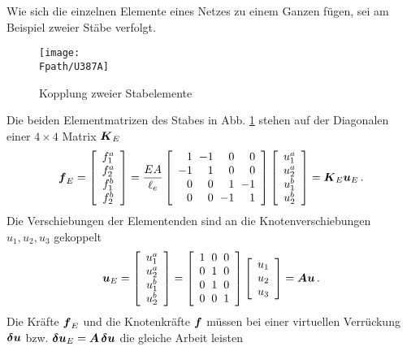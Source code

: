 Wie sich die einzelnen Elemente eines Netzes zu einem Ganzen f\"{u}gen, sei am Beispiel zweier St\"{a}be verfolgt.

\begin{figure}[tbp] \centering
\centering
\texttt{[image: \\Fpath/U387A]}
\caption{Kopplung zweier Stabelemente }
\label{U387A}
\end{figure}%

Die beiden Elementmatrizen des Stabes in Abb. \ref{U387A} stehen auf der Diagonalen einer $4 \times 4$ Matrix $\mbox{\boldmath $K$}_E$
\begin{align}
\vek f_E = \left[ \barr{c} f_1^a \\ f_2^a \\ f_1^b \\ f_2^b \earr \right] =  \frac{EA}{\ell_e} \left [
\barr {r @{\hspace{2mm}} r @{\hspace{2mm}} r @{\hspace{2mm}} r} 1 & -1 & 0 & 0 \\ -1 & 1 & 0 & 0 \\ 0 & 0 & 1 & -1 \\ 0 & 0 & -1 & 1 \\ \earr \right] \left[ \barr{cc} u_1^a \\ u_2^a \\ u_1^b \\ u_2^b \earr \right] = \vek K_E\vek u_E\,.
\end{align}
Die Verschiebungen der Elementenden sind an die Knotenverschiebungen $u_1, u_2, u_3$ gekoppelt
\begin{align}
\vek u_E = \left[ \barr{c} u_1^a \\ u_2^a \\ u_1^b \\ u_2^b \earr \right] = \left [
\barr {r @{\hspace{2mm}} r @{\hspace{2mm}} r } 1 & 0 & 0  \\ 0 & 1 & 0 \\ 0 & 1 & 0 \\ 0 & 0 &  1 \\ \earr \right] \left[ \barr{cc} u_1 \\ u_2 \\ u_3 \earr \right] = \vek  A\vek u\,.
\end{align}
Die Kr\"{a}fte $\mbox{\boldmath $f$}_E$ und die Knotenkr\"{a}fte $\mbox{\boldmath $f$}$ m\"{u}ssen bei einer virtuellen Verr\"{u}ckung $\mbox{\boldmath $\delta$} \mbox{\boldmath $u$}$ bzw. $\mbox{\boldmath $\delta$} \mbox{\boldmath $u$}_E = \mbox{\boldmath $A$}\,\mbox{\boldmath $\delta$} \mbox{\boldmath $u$}$ die gleiche Arbeit leisten

